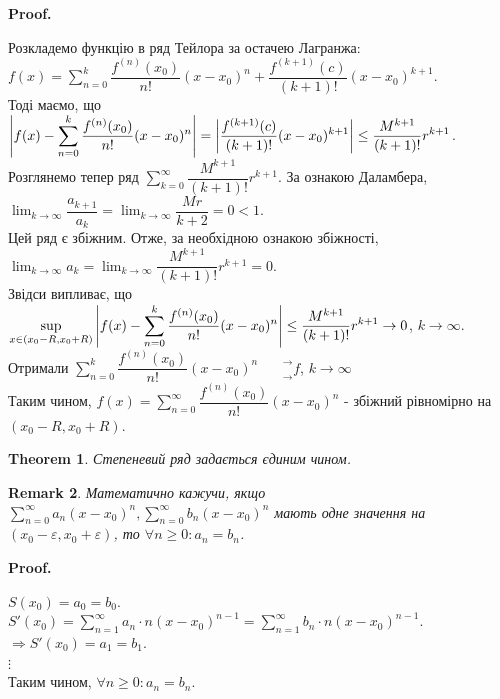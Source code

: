 \documentclass[a4paper, 10pt]{article}
\makeatletter
\def\huge{\displaystyle}
\def\qed{$\blacksquare$}
\theoremstyle{theoremdd}
\newtheorem{theorem}{Theorem}[subsection]
\theoremstyle{theoremdd}
\theoremstyle{theoremdd}
\theoremstyle{theoremdd}
\theoremstyle{theoremdd}
\theoremstyle{theoremdd}
\newtheorem{remark}[theorem]{Remark}
\theoremstyle{theoremdd}
\theoremstyle{theoremdd}
\renewenvironment{proof}[1][Proof.\\]{\par
\pushQED{\hfill \qed}%
\normalfont \topsep6\p@\@plus6\p@\relax
\trivlist
\item\relax
{\bfseries
#1\@addpunct{.}}\hspace\labelsep\ignorespaces
}{%
\popQED\endtrivlist\@endpefalse
}
\makeatother
\begin{document}
\begin{proof}
Розкладемо функцію в ряд Тейлора за остачею Лагранжа:\\
$f(x) = \huge \sum_{n=0}^k \dfrac{f^{(n)}(x_0)}{n!}(x-x_0)^n + \dfrac{f^{(k+1)}(c)}{(k+1)!}(x-x_0)^{k+1}$.\\
Тоді маємо, що\\
$\huge \abs{f(x) - \sum_{n=0}^k \dfrac{f^{(n)}(x_0)}{n!}(x-x_0)^n} = \abs{\dfrac{f^{(k+1)}(c)}{(k+1)!}(x-x_0)^{k+1}} \leq \dfrac{M^{k+1}}{(k+1)!}r^{k+1}$.\\
Розглянемо тепер ряд $\huge \sum_{k=0}^\infty \dfrac{M^{k+1}}{(k+1)!} r^{k+1}$. За ознакою Даламбера, $\huge \lim_{k \to \infty} \dfrac{a_{k+1}}{a_k} = \huge \lim_{k \to \infty} \dfrac{Mr}{k+2} = 0 < 1$.\\
Цей ряд є збіжним. Отже, за необхідною ознакою збіжності, $\huge \lim_{k \to \infty} a_k = \lim_{k \to \infty} \dfrac{M^{k+1}}{(k+1)!} r^{k+1} = 0$.\\
Звідси випливає, що\\
$\huge \sup_{x \in (x_0-R,x_0+R)} \abs{f(x) - \sum_{n=0}^k \dfrac{f^{(n)}(x_0)}{n!}(x-x_0)^n} \leq \dfrac{M^{k+1}}{(k+1)!}r^{k+1} \to 0$, $k \to \infty$.\\
Отримали $\huge \sum_{n=0}^k \dfrac{f^{(n)}(x_0)}{n!}(x-x_0)^n \phantom{()}^\rightarrow_\rightarrow f$, $k \to \infty$\\
Таким чином, $f(x) = \huge \sum_{n=0}^\infty \dfrac{f^{(n)}(x_0)}{n!}(x-x_0)^n$ - збіжний рівномірно на $(x_0-R,x_0+R)$.
\end{proof}

\begin{theorem}
Степеневий ряд задається єдиним чином.
\end{theorem}

\begin{remark}
Математично кажучи, якщо $\huge \sum_{n=0}^\infty a_n(x-x_0)^n, \sum_{n=0}^\infty b_n(x-x_0)^n$ мають одне значення на \\ $(x_0-\varepsilon, x_0+\varepsilon)$, то $\forall n \geq 0: a_n = b_n$.
\end{remark}

\begin{proof}
$S(x_0) = a_0 = b_0$.\\
$S'(x_0) = \huge \sum_{n=1}^\infty a_n \cdot n(x-x_0)^{n-1} = \sum_{n=1}^\infty b_n \cdot n(x-x_0)^{n-1}$.\\
$\Rightarrow S'(x_0) = a_1 = b_1$.\\
$\vdots$\\
Таким чином, $\forall n \geq 0: a_n = b_n$.
\end{proof}
\end{document}
